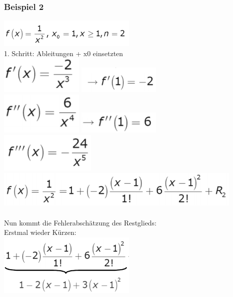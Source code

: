 \documentclass[12pt,a4paper]{article}
\begin{document}
\subsubsection{Beispiel 2}
\includegraphics[width=0.5\textwidth]{BIlder/V1/21.png}\\
1. Schritt: Ableitungen + x0 einsetzten\\
\includegraphics[width=0.3\textwidth]{BIlder/V1/22.png}
\includegraphics[width=0.3\textwidth]{BIlder/V1/22_1.png}\\
\includegraphics[width=0.3\textwidth]{BIlder/V1/23.png}
\includegraphics[width=0.3\textwidth]{BIlder/V1/23_1.png}\\
\includegraphics[width=0.35\textwidth]{BIlder/V1/24.png}
\includegraphics[width=0.9\textwidth]{BIlder/V1/25.png}\\\\
\newpage
Nun kommt die Fehlerabschätzung des Restglieds:\\
Erstmal wieder Kürzen:\\
\includegraphics[width=0.5\textwidth]{BIlder/V1/26.png}\\
\end{document}
